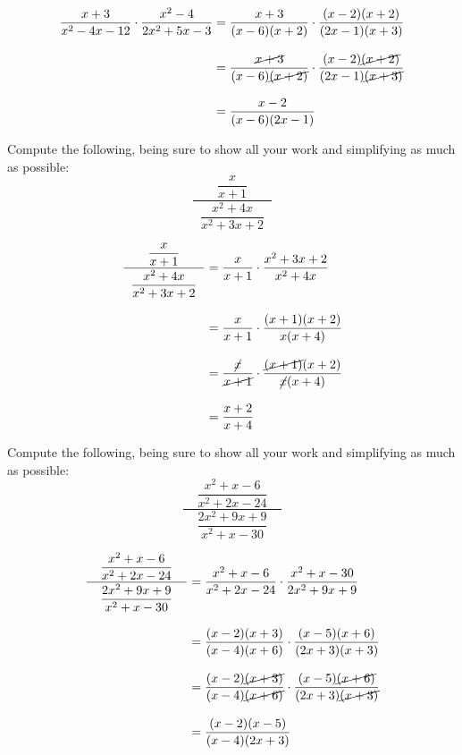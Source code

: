 \documentclass[11pt,letterpaper]{article}
\begin{document}
\sol
	\[
	\begin{aligned}
	\dfrac{x + 3}{x^2 - 4x - 12} \cdot \dfrac{x^2 - 4}{2x^2 + 5x - 3}&= \dfrac{x + 3}{(x - 6)(x + 2)} \cdot \dfrac{(x - 2)(x + 2)}{(2x - 1)(x + 3)} \\[0.3cm]
	&= \dfrac{\cancel{x + 3}}{(x - 6)\cancel{(x + 2)}} \cdot \dfrac{(x - 2)\cancel{(x + 2)}}{(2x - 1)\cancel{(x + 3)}} \\[0.3cm]
	&= \dfrac{x - 2}{(x - 6)(2x - 1)}
	\end{aligned}
	\]





\newpage





 Compute the following, being sure to show all your work and simplifying as much as possible:
	\[
	\dfrac{\phantom{.}\;\;\;\;\;\;\dfrac{x}{x + 1}\;\;\;\;\;\;\phantom{.}}{\dfrac{x^2 + 4x}{x^2 + 3x + 2}}
	\] \pspace

\sol 
	\[
	\begin{aligned}
	\dfrac{\phantom{.}\;\;\;\;\;\;\dfrac{x}{x + 1}\;\;\;\;\;\;\phantom{.}}{\dfrac{x^2 + 4x}{x^2 + 3x + 2}}&= \dfrac{x}{x + 1} \cdot \dfrac{x^2 + 3x + 2}{x^2 + 4x} \\[0.3cm]
	&= \dfrac{x}{x + 1} \cdot \dfrac{(x + 1)(x + 2)}{x(x + 4)} \\[0.3cm] 
	&= \dfrac{\cancel{x}}{\cancel{x + 1}} \cdot \dfrac{\cancel{(x + 1)}(x + 2)}{\cancel{x}(x + 4)} \\[0.3cm] 
	&= \dfrac{x + 2}{x + 4}
	\end{aligned}
	\]





\newpage





 Compute the following, being sure to show all your work and simplifying as much as possible:
	\[
	\dfrac{\phantom{.}\;\;\;\dfrac{x^2 + x - 6}{x^2 + 2x - 24}\;\;\;\phantom{.}}{\dfrac{2x^2 + 9x + 9}{x^2 + x - 30}}
	\] \pspace

\sol 
	\[
	\begin{aligned}
	\dfrac{\phantom{.}\;\;\;\dfrac{x^2 + x - 6}{x^2 + 2x - 24}\;\;\;\phantom{.}}{\dfrac{2x^2 + 9x + 9}{x^2 + x - 30}}&= \dfrac{x^2 + x - 6}{x^2 + 2x - 24} \cdot \dfrac{x^2 + x - 30}{2x^2 + 9x + 9} \\[0.3cm]
	&= \dfrac{(x - 2)(x + 3)}{(x - 4)(x + 6)} \cdot \dfrac{(x - 5)(x + 6)}{(2x + 3)(x + 3)} \\[0.3cm]
	&= \dfrac{(x - 2)\cancel{(x + 3)}}{(x - 4)\cancel{(x + 6)}} \cdot \dfrac{(x - 5)\cancel{(x + 6)}}{(2x + 3)\cancel{(x + 3)}} \\[0.3cm]
	&= \dfrac{(x - 2)(x - 5)}{(x - 4)(2x + 3)}
	\end{aligned}
	\]


\end{document}
